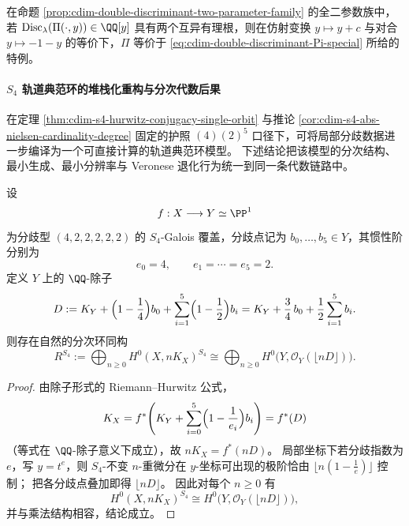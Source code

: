 \begin{conjecture}[双判别同步族的有理分歧极小性]\label{conj:cdim-double-discriminant-rational-branch-minimality}
在命题 \ref{prop:cdim-double-discriminant-two-parameter-family} 的全二参数族中，若 \(\mathrm{Disc}_{\lambda}(\Pi(\cdot,y))\in\QQ[y]\) 具有两个互异有理根，则在仿射变换 \(y\mapsto y+c\) 与对合 \(y\mapsto-1-y\) 的等价下，\(\Pi\) 等价于 \eqref{eq:cdim-double-discriminant-Pi-special} 所给的特例。
\end{conjecture}

\paragraph{\texorpdfstring{$S_4$}{S4} 轨道典范环的堆栈化重构与分次代数后果}
在定理 \ref{thm:cdim-s4-hurwitz-conjugacy-single-orbit} 与推论 \ref{cor:cdim-s4-abs-nielsen-cardinality-degree} 固定的护照
\((4)(2)^5\)
口径下，可将局部分歧数据进一步编译为一个可直接计算的轨道典范环模型。
下述结论把该模型的分次结构、最小生成、最小分辨率与 Veronese 退化行为统一到同一条代数链路中。

\begin{conclusion}\label{con:cdim-s4-stacky-pluricanonical-ring}
设
\[
f:X\longrightarrow Y\simeq\PP^1
\]
为分歧型 \((4,2,2,2,2,2)\) 的 \(S_4\)-Galois 覆盖，分歧点记为 \(b_0,\dots,b_5\in Y\)，其惯性阶分别为
\[
e_0=4,\qquad e_1=\cdots=e_5=2.
\]
定义 \(Y\) 上的 \(\QQ\)-除子
\[
D
:=
K_Y+\Bigl(1-\frac14\Bigr)b_0+\sum_{i=1}^5\Bigl(1-\frac12\Bigr)b_i
=
K_Y+\frac34\,b_0+\frac12\sum_{i=1}^5 b_i.
\]
则存在自然的分次环同构
\[
R^{S_4}
:=
\bigoplus_{n\ge 0}H^0(X,nK_X)^{S_4}
\cong
\bigoplus_{n\ge 0}H^0\!\bigl(Y,\mathcal O_Y(\lfloor nD\rfloor)\bigr).
\]
\end{conclusion}
\begin{proof}
由除子形式的 Riemann--Hurwitz 公式，
\[
K_X=f^*\!\left(K_Y+\sum_{i=0}^5\Bigl(1-\frac1{e_i}\Bigr)b_i\right)=f^*(D)
\]
（等式在 \(\QQ\)-除子意义下成立），故 \(nK_X=f^*(nD)\)。
局部坐标下若分歧指数为 \(e\)，写 \(y=t^e\)，则 \(S_4\)-不变 \(n\)-重微分在 \(y\)-坐标可出现的极阶恰由 \(\lfloor n(1-\tfrac1e)\rfloor\) 控制；
把各分歧点叠加即得 \(\lfloor nD\rfloor\)。
因此对每个 \(n\ge 0\) 有
\[
H^0(X,nK_X)^{S_4}\cong H^0\!\bigl(Y,\mathcal O_Y(\lfloor nD\rfloor)\bigr),
\]
并与乘法结构相容，结论成立。
\end{proof}

